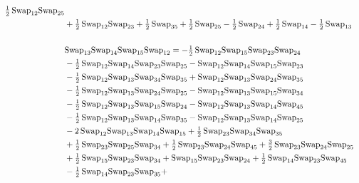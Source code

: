 \documentclass[12pt,dvipsnames,accepted=2016-08-18,a4paper,onecolumn]{quantumarticle}
\numberwithin{equation}{section}
\theoremstyle{definition}
\begin{document}
\begin{align*}
        \tfrac12\,\textnormal{Swap}_{12} \textnormal{Swap}_{25}\\ & + \tfrac12\,\textnormal{Swap}_{12} \textnormal{Swap}_{23} + \tfrac12\,\textnormal{Swap}_{35} + \tfrac12\,\textnormal{Swap}_{25} - \tfrac12\,\textnormal{Swap}_{24} + \tfrac12\,\textnormal{Swap}_{14} -
        \tfrac12\,\textnormal{Swap}_{13}\\
        \\
        &\textnormal{Swap}_{13}   \textnormal{Swap}_{14}   \textnormal{Swap}_{15}   \textnormal{Swap}_{12} = -\tfrac12\,\textnormal{Swap}_{12} \textnormal{Swap}_{15} \textnormal{Swap}_{23} \textnormal{Swap}_{24}\\ & - \tfrac12\,\textnormal{Swap}_{12} \textnormal{Swap}_{14} \textnormal{Swap}_{23} \textnormal{Swap}_{25} - \textnormal{Swap}_{12} \textnormal{Swap}_{14} \textnormal{Swap}_{15} \textnormal{Swap}_{23}\\ & -
        \tfrac12\,\textnormal{Swap}_{12} \textnormal{Swap}_{13} \textnormal{Swap}_{34} \textnormal{Swap}_{35} + \textnormal{Swap}_{12} \textnormal{Swap}_{13} \textnormal{Swap}_{24} \textnormal{Swap}_{35}\\ & - \tfrac12\,\textnormal{Swap}_{12} \textnormal{Swap}_{13} \textnormal{Swap}_{24} \textnormal{Swap}_{25} -
        \textnormal{Swap}_{12} \textnormal{Swap}_{13} \textnormal{Swap}_{15} \textnormal{Swap}_{34}\\ & - \tfrac12\,\textnormal{Swap}_{12} \textnormal{Swap}_{13} \textnormal{Swap}_{15} \textnormal{Swap}_{24} - \textnormal{Swap}_{12} \textnormal{Swap}_{13} \textnormal{Swap}_{14} \textnormal{Swap}_{45}\\ & -
        \tfrac12\,\textnormal{Swap}_{12} \textnormal{Swap}_{13} \textnormal{Swap}_{14} \textnormal{Swap}_{35} - \textnormal{Swap}_{12} \textnormal{Swap}_{13} \textnormal{Swap}_{14} \textnormal{Swap}_{25}\\ & - 2\,\textnormal{Swap}_{12} \textnormal{Swap}_{13} \textnormal{Swap}_{14} \textnormal{Swap}_{15} +
        \tfrac12\,\textnormal{Swap}_{23} \textnormal{Swap}_{34} \textnormal{Swap}_{35}\\ & + \tfrac12\,\textnormal{Swap}_{23} \textnormal{Swap}_{25} \textnormal{Swap}_{34} + \tfrac12\,\textnormal{Swap}_{23} \textnormal{Swap}_{24} \textnormal{Swap}_{45} + \tfrac32\,\textnormal{Swap}_{23} \textnormal{Swap}_{24} \textnormal{Swap}_{25}\\& +
        \tfrac12\,\textnormal{Swap}_{15} \textnormal{Swap}_{23} \textnormal{Swap}_{34} + \textnormal{Swap}_{15} \textnormal{Swap}_{23} \textnormal{Swap}_{24} + \tfrac12\,\textnormal{Swap}_{14} \textnormal{Swap}_{23} \textnormal{Swap}_{45}\\ & - \tfrac12\,\textnormal{Swap}_{14} \textnormal{Swap}_{23} \textnormal{Swap}_{35} +

\end{align*}
\end{document}
